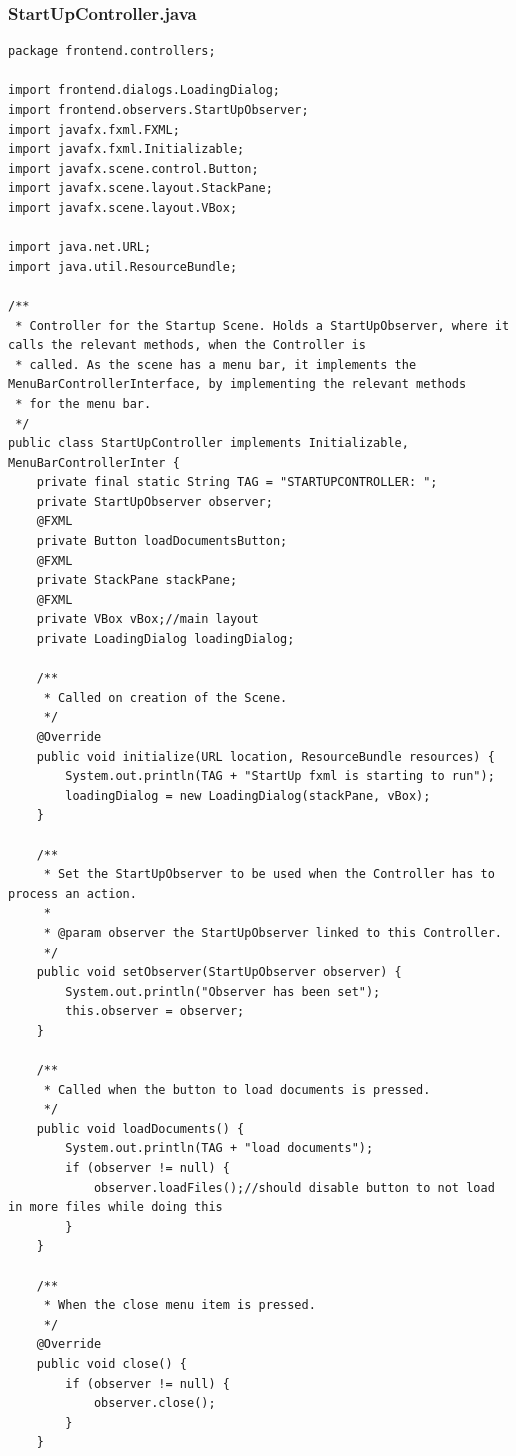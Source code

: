 \subsubsection{StartUpController.java}
\begin{lstlisting}
package frontend.controllers;

import frontend.dialogs.LoadingDialog;
import frontend.observers.StartUpObserver;
import javafx.fxml.FXML;
import javafx.fxml.Initializable;
import javafx.scene.control.Button;
import javafx.scene.layout.StackPane;
import javafx.scene.layout.VBox;

import java.net.URL;
import java.util.ResourceBundle;

/**
 * Controller for the Startup Scene. Holds a StartUpObserver, where it calls the relevant methods, when the Controller is
 * called. As the scene has a menu bar, it implements the MenuBarControllerInterface, by implementing the relevant methods
 * for the menu bar.
 */
public class StartUpController implements Initializable, MenuBarControllerInter {
    private final static String TAG = "STARTUPCONTROLLER: ";
    private StartUpObserver observer;
    @FXML
    private Button loadDocumentsButton;
    @FXML
    private StackPane stackPane;
    @FXML
    private VBox vBox;//main layout
    private LoadingDialog loadingDialog;

    /**
     * Called on creation of the Scene.
     */
    @Override
    public void initialize(URL location, ResourceBundle resources) {
        System.out.println(TAG + "StartUp fxml is starting to run");
        loadingDialog = new LoadingDialog(stackPane, vBox);
    }

    /**
     * Set the StartUpObserver to be used when the Controller has to process an action.
     *
     * @param observer the StartUpObserver linked to this Controller.
     */
    public void setObserver(StartUpObserver observer) {
        System.out.println("Observer has been set");
        this.observer = observer;
    }

    /**
     * Called when the button to load documents is pressed.
     */
    public void loadDocuments() {
        System.out.println(TAG + "load documents");
        if (observer != null) {
            observer.loadFiles();//should disable button to not load in more files while doing this
        }
    }

    /**
     * When the close menu item is pressed.
     */
    @Override
    public void close() {
        if (observer != null) {
            observer.close();
        }
    }


\end{lstlisting}

